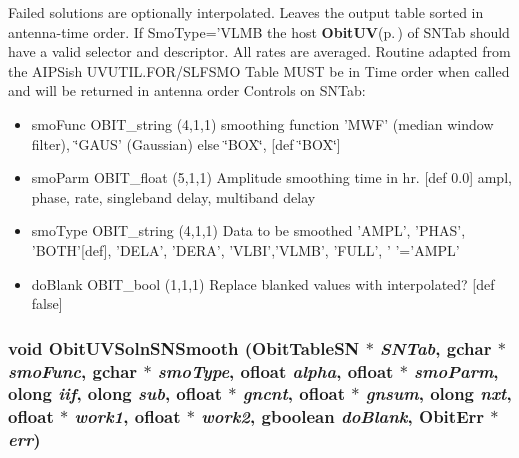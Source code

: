 Failed solutions are optionally interpolated. Leaves the output table sorted in antenna-time order. If Smo\-Type='VLMB the host {\bf Obit\-UV}{\rm (p.\,\pageref{structObitUV})} of SNTab should have a valid selector and descriptor. All rates are averaged. Routine adapted from the AIPSish UVUTIL.FOR/SLFSMO Table MUST be in Time order when called and will be returned in antenna order Controls on SNTab: \begin{itemize}
\item smo\-Func OBIT\_\-string (4,1,1) smoothing function 'MWF' (median window filter), \char`\"{}GAUS' (Gaussian) else \char`\"{}BOX\char`\"{}, [def \char`\"{}BOX\char`\"{}] \item smo\-Parm OBIT\_\-float (5,1,1) Amplitude smoothing time in hr. [def 0.0] ampl, phase, rate, singleband delay, multiband delay \item smo\-Type OBIT\_\-string (4,1,1) Data to be smoothed 'AMPL', 'PHAS', 'BOTH'[def], 'DELA', 'DERA', 'VLBI','VLMB', 'FULL', ' '='AMPL' \item do\-Blank OBIT\_\-bool (1,1,1) Replace blanked values with interpolated? [def false] 
\end{itemize}
\subsubsection{\setlength{\rightskip}{0pt plus 5cm}void Obit\-UVSoln\-SNSmooth ({\bf Obit\-Table\-SN} $\ast$ {\em SNTab}, gchar $\ast$ {\em smo\-Func}, gchar $\ast$ {\em smo\-Type}, {\bf ofloat} {\em alpha}, {\bf ofloat} $\ast$ {\em smo\-Parm}, {\bf olong} {\em iif}, {\bf olong} {\em sub}, {\bf ofloat} $\ast$ {\em gncnt}, {\bf ofloat} $\ast$ {\em gnsum}, {\bf olong} {\em nxt}, {\bf ofloat} $\ast$ {\em work1}, {\bf ofloat} $\ast$ {\em work2}, gboolean {\em do\-Blank}, {\bf Obit\-Err} $\ast$ {\em err})}\label{ObitUVSoln_8c_a31}


